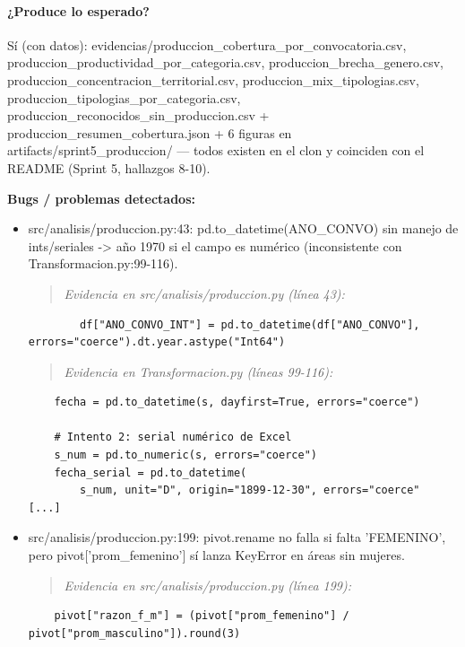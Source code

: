 \paragraph{¿Produce lo esperado?}
Sí (con datos): evidencias/produccion\_cobertura\_por\_convocatoria.csv, produccion\_productividad\_por\_categoria.csv, produccion\_brecha\_genero.csv, produccion\_concentracion\_territorial.csv, produccion\_mix\_tipologias.csv, produccion\_tipologias\_por\_categoria.csv, produccion\_reconocidos\_sin\_produccion.csv + produccion\_resumen\_cobertura.json + 6 figuras en artifacts/sprint5\_produccion/ --- todos existen en el clon y coinciden con el README (Sprint 5, hallazgos 8-10).

\begin{tcolorbox}[riesgo]
\textbf{Bugs / problemas detectados:}
\begin{itemize}
  \item src/analisis/produccion.py:43: pd.to\_datetime(ANO\_CONVO) sin manejo de ints/seriales -> año 1970 si el campo es numérico (inconsistente con Transformacion.py:99-116).
\begin{quote}\footnotesize\ttfamily
\noindent\emph{Evidencia en src/analisis/produccion.py (línea 43):}
\end{quote}
\begin{lstlisting}
        df["ANO_CONVO_INT"] = pd.to_datetime(df["ANO_CONVO"], errors="coerce").dt.year.astype("Int64")
\end{lstlisting}

\begin{quote}\footnotesize\ttfamily
\noindent\emph{Evidencia en Transformacion.py (líneas 99-116):}
\end{quote}
\begin{lstlisting}
    fecha = pd.to_datetime(s, dayfirst=True, errors="coerce")

    # Intento 2: serial numérico de Excel
    s_num = pd.to_numeric(s, errors="coerce")
    fecha_serial = pd.to_datetime(
        s_num, unit="D", origin="1899-12-30", errors="coerce"
[...]
\end{lstlisting}

  \item src/analisis/produccion.py:199: pivot.rename no falla si falta 'FEMENINO', pero pivot['prom\_femenino'] sí lanza KeyError en áreas sin mujeres.
\begin{quote}\footnotesize\ttfamily
\noindent\emph{Evidencia en src/analisis/produccion.py (línea 199):}
\end{quote}
\begin{lstlisting}
    pivot["razon_f_m"] = (pivot["prom_femenino"] / pivot["prom_masculino"]).round(3)
\end{lstlisting}


\end{itemize}
\end{tcolorbox}
